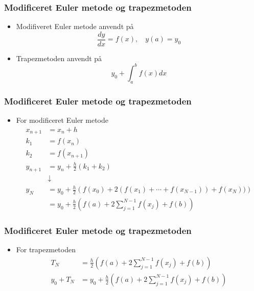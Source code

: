 \begin{frame}
\frametitle{Modificeret Euler metode og trapezmetoden}
\begin{itemize}
\item Modifiveret Euler metode anvendt på $$\frac{dy}{dx}=f(x),\phantom{hi}y(a)=y_0$$
\item Trapezmetoden anvendt på $$y_0 + \int_a^b f(x) dx$$
\end{itemize}
\end{frame}
%
\begin{frame}
\frametitle{Modificeret Euler metode og trapezmetoden}
\begin{itemize}
\item For modificeret Euler metode
\begin{align*}
x_{n+1} &= x_n + h\\
k_1 &= f(x_n)\\
k_2 &= f(x_{n+1} )\\
y_{n+1} &= y_n + \frac{h}{2}(k_1 + k_2)\\
&\downarrow\\
y_N &= y_0 + \frac{h}{2}\left( f(x_0) + 2(f(x_1) + \cdots + f(x_{N-1})) + f(x_N) ) \right)\\
 &= y_0 + \frac{h}{2}\left(f(a) + 2\sum_{j=1}^{N-1}f(x_j) + f(b)\right)
\end{align*}
\end{itemize}
\end{frame}
%
\begin{frame}
\frametitle{Modificeret Euler metode og trapezmetoden}
\begin{itemize}
\item For trapezmetoden
\begin{align*}
T_N &= \frac{h}{2} \left(f(a) + 2\sum_{j=1}^{N-1} f(x_j) + f(b) \right)\\
y_0 + T_N  &= y_0 + \frac{h}{2} \left(f(a) + 2\sum_{j=1}^{N-1} f(x_j) + f(b) \right)
\end{align*}
\end{itemize}
\end{frame}